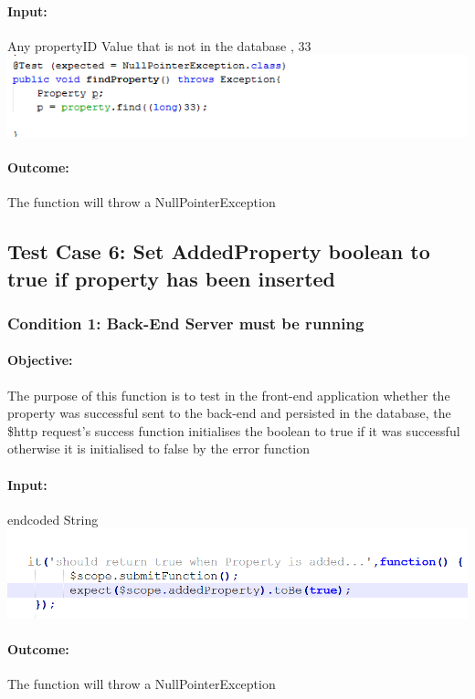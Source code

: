 \documentclass[a4paper,12pt]{article}
\begin{document}
\paragraph{Input:} Any propertyID Value that is not in the database , 33\\
\includegraphics[width=1\textwidth]{./Images/input5.png}

\paragraph{Outcome: } The function will throw a NullPointerException

\subsection{Test Case 6: Set AddedProperty boolean to true if property has been inserted}
\subsubsection{Condition 1: Back-End Server must be running}
\paragraph{Objective:}The purpose of this function is to test in the front-end application whether the property was successful sent to the back-end and persisted in the database, the \$http request's success function initialises the boolean to true if it was successful otherwise it is initialised to false by the error function
\paragraph{Input:} endcoded String\\
\includegraphics[width=1\textwidth]{./Images/input6.png}

\paragraph{Outcome: } The function will throw a NullPointerException
\end{document}
